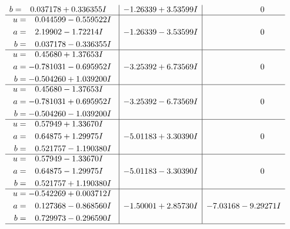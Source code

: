 \documentclass[1p]{elsarticle_modified}
\theoremstyle{definition}
\begin{document}
$$\begin{array}{c|c|c}
\begin{aligned}
b &= \phantom{-}0.037178 + 0.336355 I\end{aligned}
 & -1.26339 + 3.53599 I & \phantom{-0.000000 } 0 \\ \hline\begin{aligned}
u &= \phantom{-}0.044599 - 0.559522 I \\
a &= \phantom{-}2.19902 - 1.72214 I \\
b &= \phantom{-}0.037178 - 0.336355 I\end{aligned}
 & -1.26339 - 3.53599 I & \phantom{-0.000000 } 0 \\ \hline\begin{aligned}
u &= \phantom{-}0.45680 + 1.37653 I \\
a &= -0.781031 - 0.695952 I \\
b &= -0.504260 + 1.039200 I\end{aligned}
 & -3.25392 + 6.73569 I & \phantom{-0.000000 } 0 \\ \hline\begin{aligned}
u &= \phantom{-}0.45680 - 1.37653 I \\
a &= -0.781031 + 0.695952 I \\
b &= -0.504260 - 1.039200 I\end{aligned}
 & -3.25392 - 6.73569 I & \phantom{-0.000000 } 0 \\ \hline\begin{aligned}
u &= \phantom{-}0.57949 + 1.33670 I \\
a &= \phantom{-}0.64875 + 1.29975 I \\
b &= \phantom{-}0.521757 - 1.190380 I\end{aligned}
 & -5.01183 + 3.30390 I & \phantom{-0.000000 } 0 \\ \hline\begin{aligned}
u &= \phantom{-}0.57949 - 1.33670 I \\
a &= \phantom{-}0.64875 - 1.29975 I \\
b &= \phantom{-}0.521757 + 1.190380 I\end{aligned}
 & -5.01183 - 3.30390 I & \phantom{-0.000000 } 0 \\ \hline\begin{aligned}
u &= -0.542269 + 0.003712 I \\
a &= \phantom{-}0.127368 - 0.868560 I \\
b &= \phantom{-}0.729973 - 0.296590 I\end{aligned}
 & -1.50001 + 2.85730 I & -7.03168 - 9.29271 I\\
 \hline 
 \end{array}$$\newpage$$\begin{array}{c|c|c}  

\end{array}$$
\end{document}
